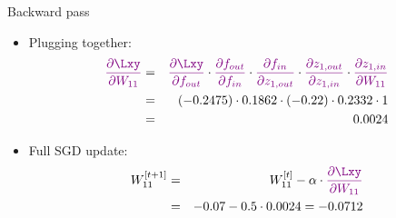 \begin{vbframe}{Backward pass}
  \begin{itemize}
    \item Plugging together: 
      \begin{eqnarray*}
         \textcolor{violet}{\frac{\partial \Lxy}{\partial W_{11}}} &=& 
         \textcolor{violet}{\frac{\partial \Lxy}{\partial f_{out}}} \cdot  \textcolor{violet}{\frac{\partial f_{out}}{\partial f_{in}}} \cdot  \textcolor{violet}{\frac{\partial f_{in}}{\partial z_{1,out}}} \cdot  \textcolor{violet}{\frac{\partial z_{1,out}}{\partial z_{1,in}}} \cdot  \textcolor{violet}{\frac{\partial z_{1,in}}{\partial W_{11}}} 
        \\ &=& (\num[round-mode=places,round-precision=4]{-0.2474531}) \cdot \num[round-mode=places,round-precision=4]{0.1862201} \cdot (-0.22) \cdot \num[round-mode=places,round-precision=4]{0.2332341} \cdot 1 
        \\ &=& \num[round-mode=places,round-precision=4]{0.0023645}
      \end{eqnarray*}
  \begin{figure}
    \centering
  \end{figure}

    \item Full SGD update: 
    \begin{eqnarray*}
      W_{11}^{[t+1]}  &=& W_{11}^{[t]} - \alpha \cdot  \textcolor{violet}{\frac{\partial \Lxy}{\partial W_{11}}} \\
                  &=& -0.07 - 0.5 \cdot \num[round-mode=places,round-precision=4]{0.0023645} = \num[round-mode=places,round-precision=4]{-0.0711823}
    \end{eqnarray*}
  \end{itemize}
\end{vbframe}

